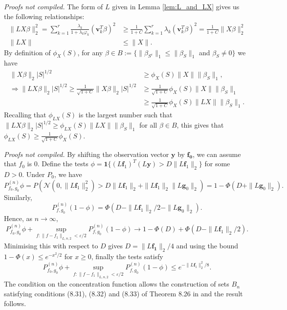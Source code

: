 \documentclass[11pt]{article}
\renewenvironment{proof}[1]{\par\noindent{\bf #1 \ }}{\hfill\BlackBox\\[2mm]}
\renewenvironment{proof}[1]{\textit{Proofs not compiled.}}{}
\newcommand{\eps}{\varepsilon}
\numberwithin{equation}{section}
\begin{document}
\begin{proof}{Proof of Lemma \ref{lem:compatibility_relation}}
The form of $L$ given in Lemma \ref{lem:L_and_LX} gives us the following relationships:
	\begin{align*}
	\|LX \beta\|_2^2 = \sum_{k=1}^r \frac{\lambda_k}{1+\lambda_k \varphi_k} (\mathbf{v}_k^T \beta)^2  &\geq \frac{1}{1+C} \sum _{k = 1}^r \lambda_k (\mathbf{v}_k^T \beta)^2 = \frac{1}{1+C} \|X\beta\|_2^2		\\
	\|LX\| &\leq \|X\|.
	\end{align*}
	By definition of $\phi_X(S)$, for any $\beta \in B:= \{\|\beta_{S^c}\|_1 \leq \|\beta_S\|_1$ and $\beta_S \neq 0\}$ we have
	\begin{align*}
	\|X \beta \|_2 |S|^{1/2} &\geq \phi_X(S) \|X\| \|\beta_S\|_1,		\\
	\Rightarrow \|L X \beta \|_2 |S|^{1/2} \geq \frac{1}{\sqrt{1+C}} \|X \beta \|_2 |S|^{1/2} &\geq \frac{1}{\sqrt{1+C}} \phi_X(S) \|X\| \|\beta_S\|_1 \\
	&\geq \frac{1}{\sqrt{1+C}} \phi_X(S) \|LX\| \|\beta_S\|_1.
	\end{align*}
	Recalling that $\phi_{LX}(S)$ is the largest number such that $\|LX \beta \|_2 |S|^{1/2} \geq \phi_{LX}(S)\|LX\|\|\beta_S\|_1$ for all $\beta \in B$, this gives that $\phi_{LX}(S) \geq \frac{1}{\sqrt{1+C}} \phi_X(S)$.
\end{proof}

\begin{proof}{Proof of Theorem \ref{thm:gp_contraction}}
By shifting the observation vector $\mathbf{y}$ by $\mathbf{f_0}$, we can assume that $f_0$ is 0.
Define the tests $\phi = \mathbf{1}\{(L\mathbf{f}_1)^T (L\mathbf{y}) > D\|L\mathbf{f}_1\|_2\}$ for some $D > 0$. Under $P_{0}$, we have
$$
P^{(n)}_{f_0, g_0} \phi = P( \mathcal{N}(0, \|L\mathbf{f}_1\|_2^2) > D\|L \mathbf{f}_1 \|_2 + \|L \mathbf{f}_1 \|_2 \|L \mathbf{g}_0\|_2) = 1 - \Phi(D + \|L\mathbf{g}_0\|_2).
$$
Similarly, 
$$
P^{(n)}_{f, g_0} (1-\phi) = \Phi(D - \|L\mathbf{f}_1\|_2/2 - \|L\mathbf{g}_0\|_2).
$$
Hence, as $n \rightarrow \infty$,
$$
P^{(n)}_{f_0, g_0} \phi + \sup_{f : \|f - f_1\|_{L, n, 2} < \eps/2} P^{(n)}_{f, g_0} (1-\phi)  \rightarrow 1 - \Phi(D) + \Phi(D - \|L \mathbf{f}_1\|_2/2).
$$
Minimising this with respect to $D$ gives $D = \|L \mathbf{f_1}\|_2/4$ and using the bound $1 - \Phi(x) \leq e^{-x^2/2}$ for $x \geq 0$, finally the tests satisfy
$$
P^{(n)}_{f_0, g_0} \phi + \sup_{f : \|f - f_1\|_{L, n, 2} < \eps/2} P^{(n)}_{f, g_0} (1-\phi) \leq e^{-\|L\mathbf{f}_1\|_2^2/8}.
$$
The condition on the concentration function allows the construction of sets $B_n$ satisfying conditions (8.31), (8.32) and (8.33) of Theorem 8.26 in \cite{FNBI} and the result follows.
\end{proof}
\end{document}
